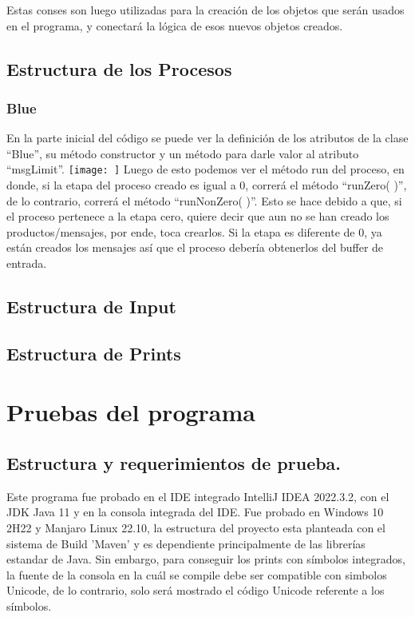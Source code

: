 \documentclass[a4paper]{article}
\begin{document}
    Estas conses son luego utilizadas para la creación de los objetos
    que serán usados en el programa, y conectará la lógica de esos
    nuevos objetos creados. 

    \subsection{Estructura de los Procesos}
    \subsubsection{Blue}
    En la parte inicial del código se puede ver la definición de los atributos de la clase “Blue”, su método constructor y un método para darle valor al atributo “msgLimit”. 
    \texttt{[image: ]}
    Luego de esto podemos ver el método run del proceso, en donde, si la etapa del proceso creado es igual a 0, correrá el método “runZero( )”, de lo contrario, correrá el método “runNonZero( )”. Esto se hace debido a que, si el proceso pertenece a la etapa cero, quiere decir que aun no se han creado los productos/mensajes, por ende, toca crearlos. Si la etapa es diferente de 0, ya están creados los mensajes así que el proceso debería obtenerlos del buffer de entrada. 

    \subsection{Estructura de Input}
    
    \subsection{Estructura de Prints}
    

\section{Pruebas del programa}

\subsection{Estructura y requerimientos de prueba.}
Este programa fue probado en el IDE integrado IntelliJ IDEA 2022.3.2, con
el JDK Java 11 y en la consola integrada del IDE. Fue probado en Windows 10 
2H22 y Manjaro Linux 22.10, la estructura del proyecto esta planteada con el
sistema de Build 'Maven' y es dependiente principalmente de las librerías estandar
de Java. Sin embargo, para conseguir los prints con símbolos integrados, la fuente
de la consola en la cuál se compile debe ser compatible con simbolos Unicode,
de lo contrario, solo será mostrado el código Unicode referente a los símbolos.
\end{document}
